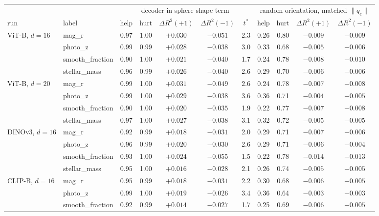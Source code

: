 \documentclass{article}
\newcommand{\norm}[1]{\lVert #1 \rVert}
\begin{document}
\begin{table}[h]
\centering\footnotesize\setlength{\tabcolsep}{3pt}
\begin{tabular}{llccccc|cccc}
\toprule
 & & \multicolumn{5}{c|}{decoder in-sphere shape term} & \multicolumn{4}{c}{random orientation, matched $\norm{q_c}$} \\
run & label & help & hurt & $\Delta R^2(+1)$ & $\Delta R^2(-1)$ & $t^{*}$ & help & hurt & $\Delta R^2(+1)$ & $\Delta R^2(-1)$ \\
\midrule
ViT-B, $d=16$ & mag\_r & 0.97 & 1.00 & $+0.030$ & $-0.051$ & 2.3 & 0.26 & 0.80 & $-0.009$ & $-0.009$ \\
 & photo\_z & 0.99 & 0.99 & $+0.028$ & $-0.038$ & 3.0 & 0.33 & 0.68 & $-0.005$ & $-0.006$ \\
 & smooth\_fraction & 0.90 & 1.00 & $+0.021$ & $-0.040$ & 1.7 & 0.24 & 0.78 & $-0.008$ & $-0.010$ \\
 & stellar\_mass & 0.96 & 0.99 & $+0.026$ & $-0.040$ & 2.6 & 0.29 & 0.70 & $-0.006$ & $-0.006$ \\
\addlinespace[2pt]
ViT-B, $d=20$ & mag\_r & 0.99 & 1.00 & $+0.031$ & $-0.049$ & 2.6 & 0.24 & 0.78 & $-0.007$ & $-0.008$ \\
 & photo\_z & 0.99 & 1.00 & $+0.029$ & $-0.038$ & 3.6 & 0.36 & 0.71 & $-0.004$ & $-0.005$ \\
 & smooth\_fraction & 0.90 & 1.00 & $+0.020$ & $-0.035$ & 1.9 & 0.22 & 0.77 & $-0.007$ & $-0.008$ \\
 & stellar\_mass & 0.97 & 1.00 & $+0.027$ & $-0.038$ & 3.1 & 0.32 & 0.72 & $-0.005$ & $-0.005$ \\
\addlinespace[2pt]
DINOv3, $d=16$ & mag\_r & 0.92 & 0.99 & $+0.018$ & $-0.031$ & 2.0 & 0.29 & 0.71 & $-0.007$ & $-0.006$ \\
 & photo\_z & 0.96 & 0.99 & $+0.020$ & $-0.030$ & 2.6 & 0.29 & 0.71 & $-0.006$ & $-0.004$ \\
 & smooth\_fraction & 0.93 & 1.00 & $+0.024$ & $-0.055$ & 1.5 & 0.22 & 0.78 & $-0.014$ & $-0.013$ \\
 & stellar\_mass & 0.95 & 1.00 & $+0.016$ & $-0.028$ & 2.1 & 0.26 & 0.74 & $-0.005$ & $-0.005$ \\
\addlinespace[2pt]
CLIP-B, $d=16$ & mag\_r & 0.95 & 0.99 & $+0.018$ & $-0.031$ & 2.2 & 0.30 & 0.68 & $-0.006$ & $-0.005$ \\
 & photo\_z & 0.99 & 1.00 & $+0.019$ & $-0.026$ & 3.4 & 0.36 & 0.64 & $-0.003$ & $-0.003$ \\
 & smooth\_fraction & 0.92 & 0.99 & $+0.014$ & $-0.027$ & 1.7 & 0.25 & 0.69 & $-0.006$ & $-0.005$ \\

\end{tabular}
\end{table}
\end{document}
